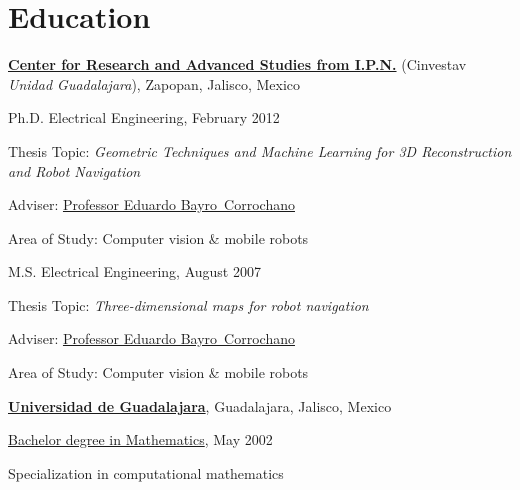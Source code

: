 \section{Education}
%
\href{https://unidad.gdl.cinvestav.mx/}{\textbf{ Center for Research and Advanced
Studies from I.P.N.}} (Cinvestav \emph{Unidad Guadalajara}),
Zapopan, Jalisco, Mexico

\begin{outerlist}
\item[] Ph.D. Electrical Engineering, \hfill{February 2012}
        \begin{innerlist}
        \item Thesis Topic: \emph{Geometric Techniques and Machine Learning
              for 3D Reconstruction and Robot Navigation}
        \item Adviser:
              \href{https://unidad.gdl.cinvestav.mx/investigadores/investigador.php?inv=11}
                   {Professor Eduardo Bayro~Corrochano}
        \item Area of Study: Computer vision \& mobile robots
        \end{innerlist}

\item[] M.S. Electrical Engineering, \hfill{August 2007}
        \begin{innerlist}
        \item Thesis Topic: \emph{Three-dimensional maps for robot navigation}
        \item Adviser:
              \href{https://unidad.gdl.cinvestav.mx/investigadores/investigador.php?inv=11}
                   {Professor Eduardo Bayro~Corrochano}
        \item Area of Study: Computer vision \& mobile robots
        \end{innerlist}
\end{outerlist}

\blankline

\href{http://www.udg.mx/}{\textbf{Universidad de Guadalajara}},
Guadalajara, Jalisco, Mexico

\begin{outerlist}
\item[] \href{http://www.cucei.udg.mx/es/oferta-academica/licenciaturas/licenciatura-en-matematicas}{Bachelor degree in Mathematics},
\hfill{May 2002}
        \begin{innerlist}
        \item Specialization in computational mathematics
        \end{innerlist}
\end{outerlist}


